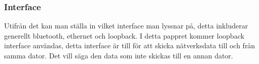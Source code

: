 \subsubsection{Interface}
Utifrån det kan man ställa in vilket interface\cite[p.~364]{networking} man lyssnar på, detta inkluderar generellt bluetooth, ethernet och loopback. I detta pappret kommer loopback interface användas, detta interface är till för att skicka nätverksdata till och från samma dator. Det vill säga den data som inte skickas till en annan dator.
